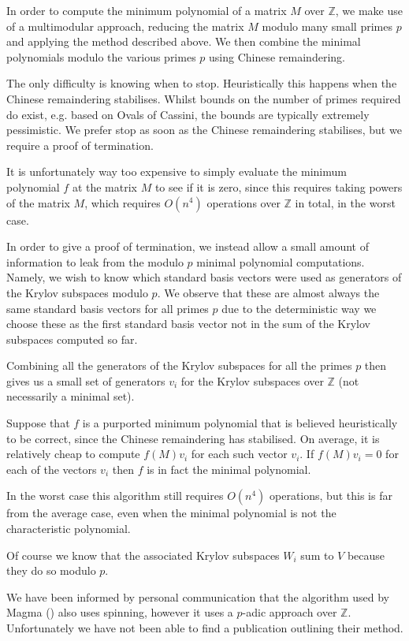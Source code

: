 \documentclass{sig-alternate-05-2015}
\begin{document}
In order to compute the minimum polynomial of a matrix $M$ over $\mathbb{Z}$,
we make use of a multimodular approach, reducing the matrix $M$ modulo many
small primes $p$ and applying the method described above. We then combine
the minimal polynomials modulo the various primes $p$ using Chinese
remaindering.

The only difficulty is knowing when to stop. Heuristically this happens
when the Chinese remaindering stabilises. Whilst bounds on the number of
primes required do exist, e.g. based on Ovals of Cassini, the bounds are
typically extremely pessimistic. We prefer stop as soon as the Chinese
remaindering stabilises, but we require a proof of termination. 

It is unfortunately way too expensive to simply evaluate the minimum
polynomial $f$ at the matrix $M$ to see if it is zero, since this requires
taking powers of the matrix $M$, which requires $O(n^4)$ operations over
$\mathbb{Z}$ in total, in the worst case.

In order to give a proof of termination, we instead allow a small amount of
information to leak from the modulo $p$ minimal polynomial computations.
Namely, we wish to know which standard basis vectors were used as
generators of the Krylov subspaces modulo $p$. We observe that these are
almost always the same standard basis vectors for all primes $p$ due to the
deterministic way we choose these as the first standard basis vector not
in the sum of the Krylov subspaces computed so far. 

Combining all the generators of the Krylov subspaces for all the primes $p$
then gives us a small set of generators $v_i$ for the Krylov subspaces over
$\mathbb{Z}$ (not necessarily a minimal set).

Suppose that  $f$ is a purported minimum polynomial that is believed
heuristically to be correct, since the Chinese remaindering has stabilised.
On average, it is relatively cheap to compute $f(M)v_i$ for each such
vector $v_i$. If $f(M)v_i = 0$ for each of the vectors $v_i$ then $f$ is
in fact the minimal polynomial.

In the worst case this algorithm still requires $O(n^4)$ operations, but
this is far from the average case, even when the minimal polynomial is not
the characteristic polynomial.

Of course we know that the associated Krylov subspaces $W_i$ sum to $V$
because they do so modulo $p$.

We have been informed by personal communication that the algorithm used by
Magma (\cite{magma}) also uses spinning, however it uses a $p$-adic
approach over $\mathbb{Z}$. Unfortunately we have not been able to find a
publication outlining their method.
\end{document}
